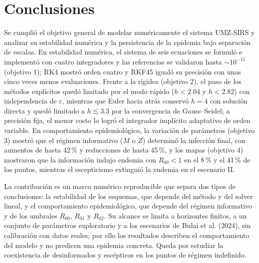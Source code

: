 \section{Conclusiones}\label{sec:conclusiones}
Se cumplió el objetivo general de modelar numéricamente el sistema UMZ-SIRS y analizar su estabilidad numérica y la persistencia de la epidemia bajo separación de escalas. En estabilidad numérica, el sistema de seis ecuaciones se formuló e implementó con cuatro integradores y las referencias se validaron hasta $\sim10^{-11}$ (objetivo 1); RK4 mostró orden cuatro y RKF45 igualó su precisión con unas cinco veces menos evaluaciones. Frente a la rigidez (objetivo 2), el paso de los métodos explícitos quedó limitado por el modo rápido ($h<2.04$ y $h<2.82$) con independencia de $\varepsilon$, mientras que Euler hacia atrás conservó $h=4$ con solución directa y quedó limitado a $h\lesssim3.3$ por la convergencia de Gauss--Seidel; a precisión fija, el menor costo lo logró el integrador implícito adaptativo de orden variable. En comportamiento epidemiológico, la variación de parámetros (objetivo 3) mostró que el régimen informativo ($M$ o $Z$) determinó la infección final, con aumentos de hasta 42\,\% y reducciones de hasta 45\,\%, y los mapas (objetivo 4) mostraron que la información indujo endemia con $R_{00}<1$ en el 8\,\% y el 41\,\% de los puntos, mientras el escepticismo extinguió la endemia en el escenario II.

La contribución es un marco numérico reproducible que separa dos tipos de conclusiones: la estabilidad de los esquemas, que depende del método y del solver lineal, y el comportamiento epidemiológico, que depende del régimen informativo y de los umbrales $R_{00}$, $R_{01}$ y $R_{02}$. Su alcance se limita a horizontes finitos, a un conjunto de parámetros exploratorio y a los escenarios de Bulai et al. (2024), sin calibración con datos reales; por ello los resultados describen el comportamiento del modelo y no predicen una epidemia concreta. Queda por estudiar la coexistencia de desinformados y escépticos en los puntos de régimen indefinido.
